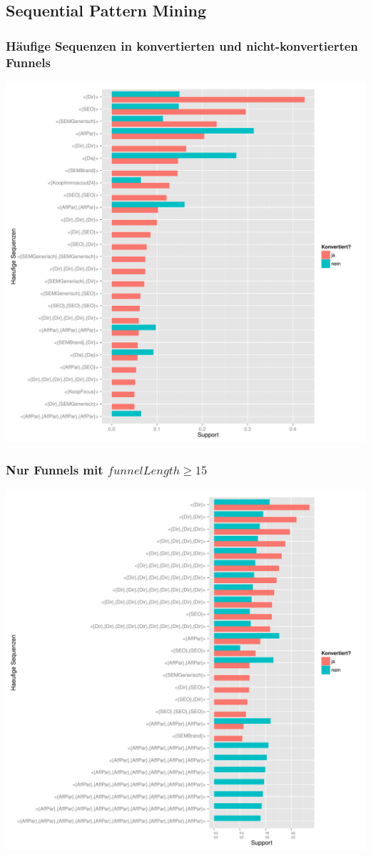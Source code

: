 \subsection{Sequential Pattern Mining}

\begin{frame}\frametitle{Häufige Sequenzen in konvertierten und nicht-konvertierten Funnels}
	\centering\includegraphics[scale=0.3]{spm_all.pdf}
\end{frame}

\begin{frame}\frametitle{Nur Funnels mit $funnelLength \geq 15$}
	\centering\includegraphics[scale=0.3]{spm_min15.pdf}
\end{frame}

